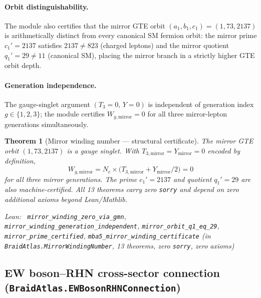 \documentclass[11pt,a4paper]{article}
\newenvironment{leanref}%
  {\par\smallskip\noindent\begingroup\raggedright\textup{Lean:}~}%
  {\par\endgroup}
\newtheorem{theorem}{Theorem}[section]
\theoremstyle{definition}
\begin{document}
\paragraph{Orbit distinguishability.}
The module also certifies that the mirror GTE orbit
$(a_1, b_1, c_1) = (1, 73, 2137)$ is arithmetically distinct from
every canonical SM fermion orbit: the mirror prime $c_1' = 2137$ satisfies
$2137 \ne 823$ (charged leptons) and the mirror quotient $q_1' = 29 \ne 11$
(canonical SM), placing the mirror branch in a strictly higher GTE orbit depth.

\paragraph{Generation independence.}
The gauge-singlet argument $(T_3 = 0,\, Y = 0)$ is independent of generation index
$g \in \{1,2,3\}$; the module certifies $W_{g,\text{mirror}} = 0$ for all three
mirror-lepton generations simultaneously.

\begin{theorem}[Mirror winding number --- structural certificate]\label{thm:mirror_winding}
The mirror GTE orbit $(1, 73, 2137)$ is a gauge singlet.  With
$T_{3,\text{mirror}} = Y_{\text{mirror}} = 0$ encoded by definition,
\[
  W_{g,\text{mirror}} = N_c \times \bigl(T_{3,\text{mirror}} + Y_{\text{mirror}}/2\bigr) = 0
\]
for all three mirror generations.  The prime $c_1' = 2137$ and quotient
$q_1' = 29$ are also machine-certified.  All 13 theorems carry zero
\texttt{sorry} and depend on zero additional axioms beyond Lean/Mathlib.
\begin{leanref}
\lstinline|mirror_winding_zero_via_gmn|,
\lstinline|mirror_winding_generation_independent|,
\lstinline|mirror_orbit_q1_eq_29|,
\lstinline|mirror_prime_certified|,
\lstinline|mba5_mirror_winding_certificate|
\textup{(in \texttt{BraidAtlas.MirrorWindingNumber}, 13 theorems, zero \texttt{sorry},
zero axioms)}
\end{leanref}
\end{theorem}

\subsection{EW boson--RHN cross-sector connection
            (\texttt{BraidAtlas.\allowbreak EWBosonRHNConnection})}
\label{subsec:ew_rhn_connection_lean}
\end{document}
